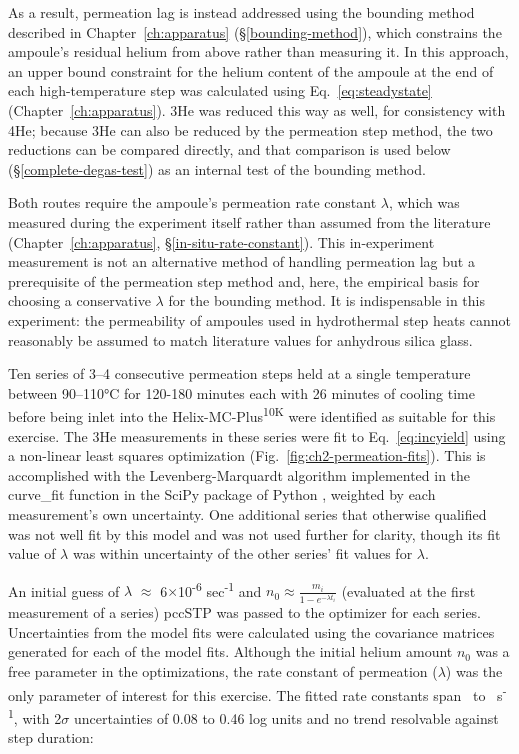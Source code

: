 As a result, permeation lag is instead addressed using the bounding method described in Chapter~\ref{ch:apparatus} (\S\ref{bounding-method}), which constrains the ampoule's residual helium from above rather than measuring it.
In this approach, an upper bound constraint for the helium content of the ampoule at the end of each high-temperature step was
calculated using Eq.~\eqref{eq:steadystate} (Chapter~\ref{ch:apparatus}). 3He was reduced this way as well, for consistency with 4He; because 3He can also be reduced by the permeation step method, the two reductions can be compared directly, and that comparison is used below (\S\ref{complete-degas-test}) as an internal test of the bounding method.

Both routes require the ampoule's permeation rate constant $\lambda$, which was measured during the experiment itself rather than assumed from the literature (Chapter~\ref{ch:apparatus}, \S\ref{in-situ-rate-constant}). This in-experiment measurement is not an alternative method of handling permeation lag but a prerequisite of the permeation step method and, here, the empirical basis for choosing a conservative $\lambda$ for the bounding method. It is indispensable in this experiment: the permeability of ampoules used in hydrothermal step heats
cannot reasonably be assumed to match literature values for anhydrous silica glass.

Ten series of 3--4 consecutive permeation steps held at a single
temperature between 90--110°C for 120-180 minutes each with 26 minutes of
cooling time before being inlet into the Helix-MC-Plus\textsuperscript{10K} were
identified as suitable for this exercise. The 3He measurements in these
series were fit to Eq.~\eqref{eq:incyield} using a non-linear least
squares optimization (Fig.~\ref{fig:ch2-permeation-fits}). This is accomplished with
the Levenberg-Marquardt algorithm implemented in
the curve\_fit function in the SciPy package of Python
\citep{virtanen2020}, weighted by each measurement's own uncertainty.
One additional series that otherwise qualified was not well fit by this
model and was not used further for clarity, though its fit value of
$\lambda$ was within uncertainty of the other series' fit values for
$\lambda$.

An initial guess of $\lambda$ $\approx$ 6$\times$10\textsuperscript{-6}
sec\textsuperscript{-1} and \(n_{0} \approx \frac{m_{i}}{1 - e^{- \lambda t_{i}}}\)
(evaluated at the first measurement of a series) pccSTP was passed to
the optimizer for each series. Uncertainties from the model fits were
calculated using the covariance matrices generated for each of the model
fits. Although the initial helium amount \(n_{0}\) was a free parameter
in the optimizations, the rate constant of permeation ($\lambda$) was
the only parameter of interest for this exercise. The fitted rate constants span
\ChTwoPermLamMin\ to \ChTwoPermLamMax\ s\textsuperscript{-1}, with 2$\sigma$ uncertainties of
0.08 to 0.46 log units and no trend resolvable against step duration:

